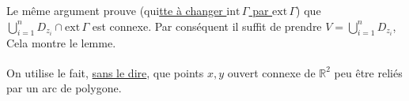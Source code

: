 \margin{!\ $\cdot$} Le même argument prouve (qui\uline{tte à changer $\mathrm{int}\,\Gamma$ par $\mathrm{ext}\,\Gamma$}) que $\bigcup\limits_{i=1}^{n}D_{z_{i}}\cap\mathrm{ext}\,\Gamma$ est connexe. Par conséquent il suffit de prendre $V=\bigcup\limits_{i=1}^{n}D_{z_{i}}$, Cela montre le lemme.

On\textsuperscript{\unsure{$*$}} utilise le fait, \uline{sans le dire}, que   points $x,y$   ouvert connexe de $\mathbb{R}^{2}$ peu être reliés par un arc de polygone.
